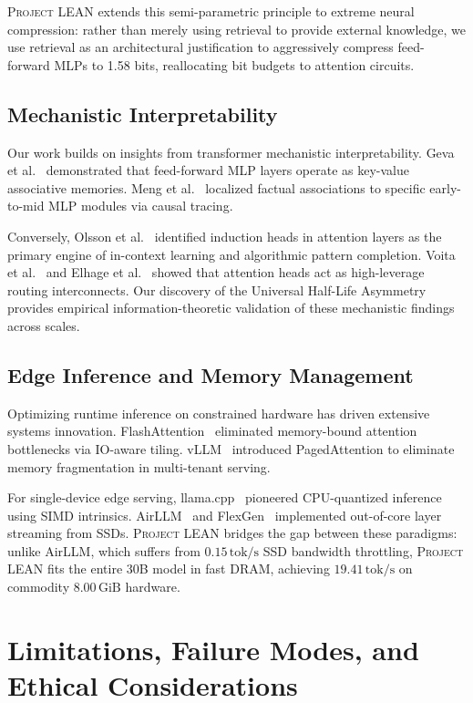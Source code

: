 \documentclass[10pt,twocolumn,letterpaper]{article}
\newcommand{\systemname}{\textsc{Project LEAN}}
\begin{document}
\systemname{} extends this semi-parametric principle to extreme neural compression: rather than merely using retrieval to provide external knowledge, we use retrieval as an architectural justification to aggressively compress feed-forward MLPs to 1.58 bits, reallocating bit budgets to attention circuits.

\subsection{Mechanistic Interpretability}
Our work builds on insights from transformer mechanistic interpretability. Geva et al.~\cite{geva2021transformer} demonstrated that feed-forward MLP layers operate as key-value associative memories. Meng et al.~\cite{meng2022locating} localized factual associations to specific early-to-mid MLP modules via causal tracing. 

Conversely, Olsson et al.~\cite{olsson2022incontext} identified induction heads in attention layers as the primary engine of in-context learning and algorithmic pattern completion. Voita et al.~\cite{voita2019analyzing} and Elhage et al.~\cite{elhage2022superposition} showed that attention heads act as high-leverage routing interconnects. Our discovery of the Universal Half-Life Asymmetry provides empirical information-theoretic validation of these mechanistic findings across scales.

\subsection{Edge Inference and Memory Management}
Optimizing runtime inference on constrained hardware has driven extensive systems innovation. FlashAttention~\cite{dao2022flashattention,dao2023flashattention2} eliminated memory-bound attention bottlenecks via IO-aware tiling. vLLM~\cite{kwon2023vllm} introduced PagedAttention to eliminate memory fragmentation in multi-tenant serving. 

For single-device edge serving, llama.cpp~\cite{gerganov2023llamacpp} pioneered CPU-quantized inference using SIMD intrinsics. AirLLM~\cite{airllm2023} and FlexGen~\cite{sheng2023flexgen} implemented out-of-core layer streaming from SSDs. \systemname{} bridges the gap between these paradigms: unlike AirLLM, which suffers from $0.15\,\text{tok/s}$ SSD bandwidth throttling, \systemname{} fits the entire 30B model in fast DRAM, achieving $19.41\,\text{tok/s}$ on commodity $8.00\,\text{GiB}$ hardware.

\section{Limitations, Failure Modes, and Ethical Considerations}
\label{sec:limitations}
\end{document}
